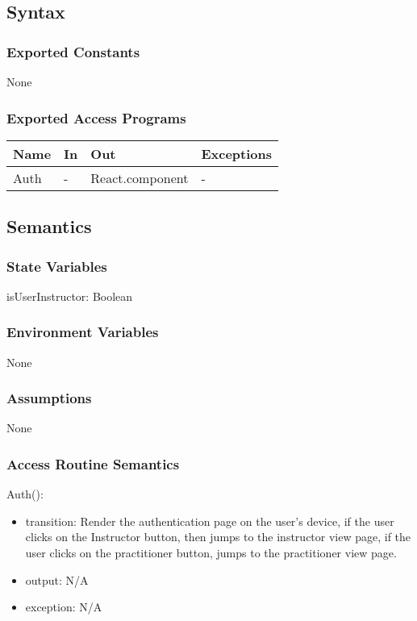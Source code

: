 \documentclass[12pt, titlepage]{article}
\begin{document}
\subsection{Syntax}

\subsubsection{Exported Constants}
None

\subsubsection{Exported Access Programs}
\begin{table}[h!]
  \centering
  \begin{tabular}{llll}
    \toprule
    \textbf{Name} & \textbf{In} & \textbf{Out}             & \textbf{Exceptions} \\
    \midrule
    Auth          & -           & React.component          & -                   \\
    \bottomrule
  \end{tabular}
\end{table}

\subsection{Semantics}

\subsubsection{State Variables}
isUserInstructor: Boolean

\subsubsection{Environment Variables}
None

\subsubsection{Assumptions}
None

\subsubsection{Access Routine Semantics}

\noindent Auth():
\begin{itemize}
  \item transition: Render the authentication page on the user's device, if the user clicks on the Instructor button, then jumps to the instructor view page, if the user clicks on the practitioner button, jumps to the practitioner view page.
  \item output: N/A
  \item exception: N/A
\end{itemize}
\end{document}
